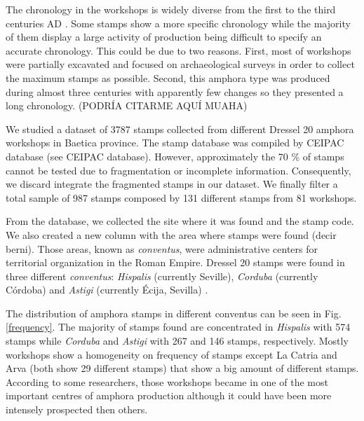 \documentclass[review]{elsarticle}
\begin{document}
The chronology in the workshops is widely diverse from the first to the third centuries AD \citep{millet_anforas_1998,rodriguez_baetican_1998,chic2005comercio}. Some stamps show a more specific chronology while the majority of them display a large activity of production being difficult to specify an accurate chronology. This could be due to two reasons. First, most of workshops were partially excavated and focused on archaeological surveys in order to collect the maximum stamps as possible. Second, this amphora type was produced during almost three centuries with apparently few changes so they presented a long chronology. (PODRÍA CITARME AQUÍ MUAHA)
 
We studied a dataset of 3787 stamps collected from different Dressel 20 amphora workshops in Baetica province. The stamp database was compiled by CEIPAC database \citep{remesal_centro_2015} (see CEIPAC database). However, approximately the 70 \% of stamps cannot be tested due to fragmentation or incomplete information. Consequently, we discard integrate the fragmented stamps in our dataset. We finally filter a total sample of 987 stamps composed by 131 different stamps from 81 workshops. 

From the database, we collected the site where it was found and the stamp code. We also created a new column with the area where stamps were found (decir berni). Those areas, known as \textit{conventus}, were administrative centers for territorial organization in the Roman Empire. Dressel 20 stamps were found in three different \textit{conventus}: \textit{Hispalis} (currently Seville), \textit{Corduba} (currently C\'ordoba) and \textit{Astigi} (currently Écija, Sevilla) \citep{rodriguez_economioleicola_1977,chic_datos_2001,berni_millet_epigrafianforica_2008} .

The distribution of amphora stamps in different conventus can be seen in Fig. \ref{frequency}. The majority of stamps found are concentrated in \textit{Hispalis} with 574 stamps while \textit{Corduba} and \textit{Astigi} with 267 and 146 stamps, respectively. Mostly workshops show a homogeneity on frequency of stamps except La Catria and Arva (both show 29 different stamps) that show a big amount of different stamps. According to some researchers, those workshops became in one of the most important centres of amphora production although it could have been more intensely prospected then others. \citep{arva_1997}
 
\end{document}
